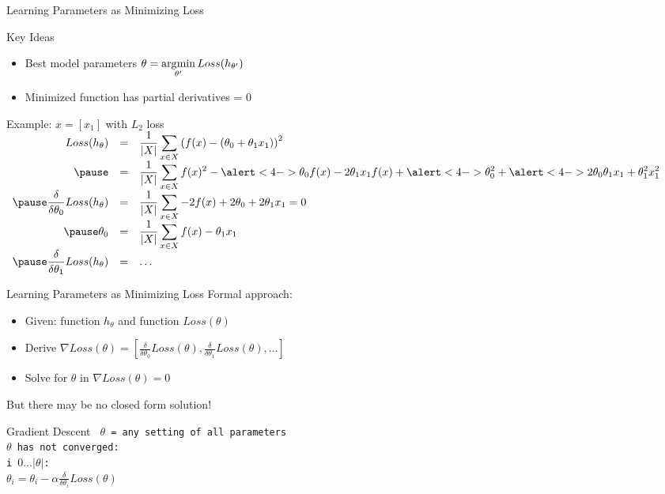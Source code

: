 \documentclass[14pt]{beamer}
\begin{document}
\begin{frame}[label=learning-via-loss]{Learning Parameters as Minimizing Loss}
\begin{block}{Key Ideas}
\begin{itemize}
\item Best model parameters $\theta = \displaystyle\operatorname*{\arg\!\min}_{\theta'} Loss(h_{\theta'})$
\item Minimized function has partial derivatives = 0
\end{itemize}
\end{block}
\pause
Example: $x = [x_1]$ with $L_2$ loss\\
\footnotesize\setlength{\arraycolsep}{0.25em}
$\begin{array}{ >{\displaystyle}r >{\displaystyle}c >{\displaystyle}l }
Loss(h_{\theta})
& = & \frac{1}{|X|}\sum_{x \in X} \left(f(x) - (\theta_0 + \theta_1 x_1)\right)^2\\
\pause
& = & \frac{1}{|X|}\sum_{x \in X} f(x)^2 - \alert<4->{ \theta_0 f(x) } - 2 \theta_1 x_1 f(x) + \alert<4->{ \theta_0^2 } + \alert<4->{ 2 \theta_0 \theta_1 x_1 } + \theta_1^2 x_1^2 \\
\pause
\displaystyle\frac{\delta}{\delta\theta_0} Loss(h_{\theta})
& = & \frac{1}{|X|}\sum_{x \in X} - 2 f(x) + 2 \theta_0 + 2 \theta_1 x_1 = 0\\
\pause
\theta_0
& = & \frac{1}{|X|}\sum_{x \in X} f(x) - \theta_1 x_1 \\
\pause
\displaystyle\frac{\delta}{\delta\theta_1} Loss(h_{\theta}) & = & \ldots \\
\end{array}$
\end{frame}

\begin{frame}[label=gradient-descent]{Learning Parameters as Minimizing Loss}
Formal approach:
\begin{itemize}
\item Given: function $h_{\theta}$ and function $Loss(\theta)$
\item Derive $\nabla Loss(\theta) = [\frac{\delta}{\delta\theta_0} Loss(\theta), \frac{\delta}{\delta\theta_1} Loss(\theta), \ldots]$
\item Solve for $\theta$ in $\nabla Loss(\theta) = 0$
\end{itemize}
\pause
But there may be no closed form solution!
\pause
\begin{block}{Gradient Descent}
\tt
$\theta$ = any setting of all parameters\\
 $\theta$ has not converged:\\
\tab {} i  $0 \ldots |\theta|$:\\
\tab \tab $\displaystyle \theta_i = \theta_i - \alpha \frac{\delta}{\delta\theta_i} Loss(\theta)$
\end{block}
\end{frame}
\end{document}
